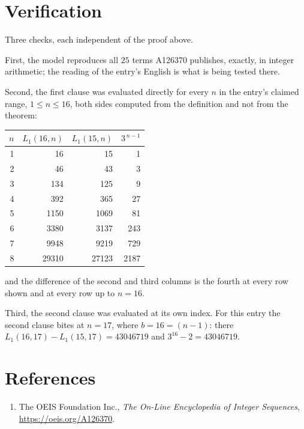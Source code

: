 \documentclass[11pt,a4paper]{article}
\theoremstyle{plain}
\theoremstyle{definition}
\begin{document}
\section{Verification}

Three checks, each independent of the proof above.

First, the model reproduces all $25$ terms A126370 publishes, exactly, in integer
arithmetic; the reading of the entry's English is what is being tested there.

Second, the first clause was evaluated directly for every $n$ in the entry's claimed range,
$1\le n\le16$, both sides computed from the definition and not from the theorem:

\begin{center}
\begin{tabular}{rrrr}
$n$ & $L_{1}(16,n)$ & $L_{1}(15,n)$ & $3^{\,n-1}$ \\ \hline
1 & 16 & 15 & 1 \\
2 & 46 & 43 & 3 \\
3 & 134 & 125 & 9 \\
4 & 392 & 365 & 27 \\
5 & 1150 & 1069 & 81 \\
6 & 3380 & 3137 & 243 \\
7 & 9948 & 9219 & 729 \\
8 & 29310 & 27123 & 2187 \\
\end{tabular}
\end{center}

\noindent and the difference of the second and third columns is the fourth at every row shown
and at every row up to $n=16$.

Third, the second clause was evaluated at its own index. For this entry the second clause bites at $n=17$, where $b=16=(n-1)$: there $L_{1}(16,17)-L_{1}(15,17)=43046719$ and $3^{16}-2=43046719$.

\section*{References}
\begin{enumerate}
\item The OEIS Foundation Inc., \emph{The On-Line Encyclopedia of Integer Sequences},
\url{https://oeis.org/A126370}.
\end{enumerate}
\end{document}
